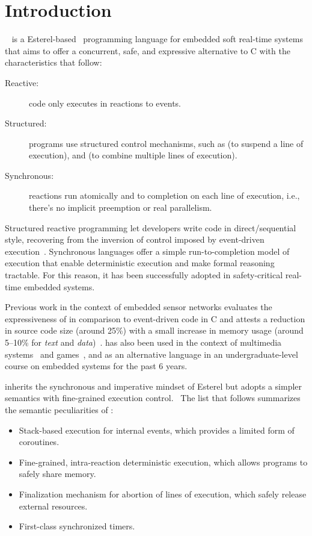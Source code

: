 \section{Introduction}
\label{sec.intro}

\CEU~\cite{ceu.sensys13,ceu.tecs17} is a Esterel-based~\cite{esterel.ieee91}
programming language for embedded soft real-time systems that aims to offer a
concurrent, safe, and expressive alternative to C with the characteristics that
follow:
%
\begin{description}
\item [Reactive:] code only executes in reactions to events.
\item [Structured:] programs use structured control mechanisms, such as
     (to suspend a line of execution), and  (to combine
    multiple lines of execution).
\item [Synchronous:] reactions run atomically and to completion on each line of
    execution, i.e., there's no implicit preemption or real parallelism.
\end{description}
%
Structured reactive programming let developers write code in direct/sequential
style, recovering from the inversion of control imposed by event-driven
execution~\cite{rp.deprecating,rp.rescala,sync_async.cooperative}.
%
Synchronous languages offer a simple run-to-completion model of execution that
enable deterministic execution and make formal reasoning tractable.
For this reason, it has been successfully adopted in safety-critical real-time
embedded systems.~\cite{rp.twelve}

Previous work in the context of embedded sensor networks evaluates the
expressiveness of \CEU in comparison to event-driven code in C and attests a
reduction in source code size (around 25\%) with a small increase in memory
usage (around 5--10\% for \emph{text} and \emph{data})~\cite{ceu.sensys13}.
%
\CEU has also been used in the context of multimedia
systems~\cite{ceumedia.webmedia16} and games~\cite{ceu.mod15}, and as an
alternative language in an undergraduate-level course on embedded systems for
the past 6 years.

\CEU inherits the synchronous and imperative mindset of Esterel but adopts a
simpler semantics with fine-grained execution control.~\cite{ceu.tecs17}
%
The list that follows summarizes the semantic peculiarities of \CEU:
%
\begin{itemize}
    \item Stack-based execution for internal events, which provides a limited
          form of coroutines.
    \item Fine-grained, intra-reaction deterministic execution, which allows
          programs to safely share memory.
    \item Finalization mechanism for abortion of lines of execution, which
          safely release external resources.
    \item First-class synchronized timers.
\end{itemize}

